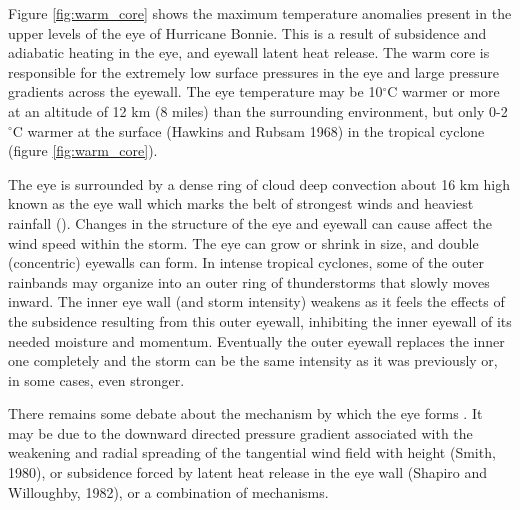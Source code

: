 Figure \ref{fig:warm_core} shows the maximum temperature anomalies present in the upper levels of the eye of Hurricane Bonnie. This is a result of subsidence and adiabatic heating in the eye, and eyewall latent heat release. The warm core is responsible for the extremely low surface pressures in the eye and large pressure gradients across the eyewall. The eye temperature may be 10$^{\circ}$C warmer or more at an altitude of 12 km (8 miles) than the surrounding environment, but only 0-2$^{\circ}$C warmer at the surface (Hawkins and Rubsam 1968) in the tropical cyclone (figure \ref{fig:warm_core}).

The eye is surrounded by a dense ring of cloud deep convection about 16 km high known as the eye wall which marks the belt of strongest winds and heaviest rainfall (\citep{bom_tc}). Changes in the structure of the eye and eyewall can cause affect the wind speed within the storm. The eye can grow or shrink in size, and double (concentric) eyewalls can form. In intense tropical cyclones, some of the outer rainbands may organize into an outer ring of thunderstorms that slowly moves inward. The inner eye wall (and storm intensity) weakens as it feels the effects of the subsidence resulting from this outer eyewall, inhibiting the inner eyewall of its needed moisture and momentum. Eventually the outer eyewall replaces the inner one completely and the storm can be the same intensity as it was previously or, in some cases, even stronger.%

There remains some debate about the mechanism by which the eye forms \citep{noaa_a11}. It may be due to the downward directed pressure gradient associated with the weakening and radial spreading of the tangential wind field with height (Smith, 1980), or subsidence forced by latent heat release in the eye wall (Shapiro and Willoughby, 1982), or a combination of mechanisms.


